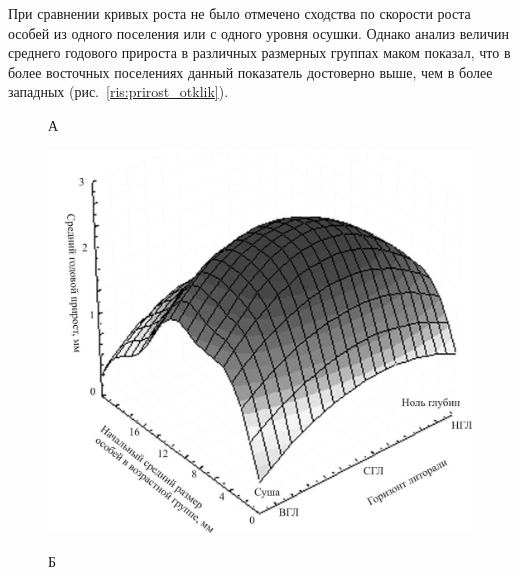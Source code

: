 {При сравнении кривых роста не было отмечено сходства по скорости роста особей из одного поселения или с одного уровня осушки. 
Однако анализ величин среднего годового прироста в различных размерных группах маком показал, что в более восточных поселениях данный показатель достоверно выше, чем в более западных (рис.~\ref{ris:prirost_otklik}). 
	\begin{figure}[]
		\begin{minipage}[b]{.5\linewidth}
				{\small А}
			\begin{center}
				\includegraphics[width=\textwidth]{../Barenc_Sea/growth_from_MSc/prirost_otklik_mareography.jpg}
			\end{center}
		\end{minipage}
	\hfil %
		\begin{minipage}[b]{.5\linewidth}
				{\small Б}
			\begin{center}

\end{center}
\end{minipage}
\end{figure}}
